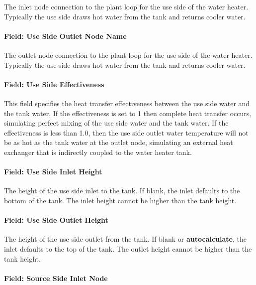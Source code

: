 The inlet node connection to the plant loop for the use side of the water heater. Typically the use side draws hot water from the tank and returns cooler water.

\paragraph{Field: Use Side Outlet Node Name}\label{field-use-side-outlet-node-name-1-000}

The outlet node connection to the plant loop for the use side of the water heater. Typically the use side draws hot water from the tank and returns cooler water.

\paragraph{Field: Use Side Effectiveness}\label{field-use-side-effectiveness-1}

This field specifies the heat transfer effectiveness between the use side water and the tank water. If the effectiveness is set to 1 then complete heat transfer occurs, simulating perfect mixing of the use side water and the tank water. If the effectiveness is less than 1.0, then the use side outlet water temperature will not be as hot as the tank water at the outlet node, simulating an external heat exchanger that is indirectly coupled to the water heater tank.

\paragraph{Field: Use Side Inlet Height}\label{field-use-side-inlet-height-000}

The height of the use side inlet to the tank. If blank, the inlet defaults to the bottom of the tank. The inlet height cannot be higher than the tank height.

\paragraph{Field: Use Side Outlet Height}\label{field-use-side-outlet-height-000}

The height of the use side outlet from the tank. If blank or \textbf{autocalculate}, the inlet defaults to the top of the tank. The outlet height cannot be higher than the tank height.

\paragraph{Field: Source Side Inlet Node}\label{field-source-side-inlet-node}

